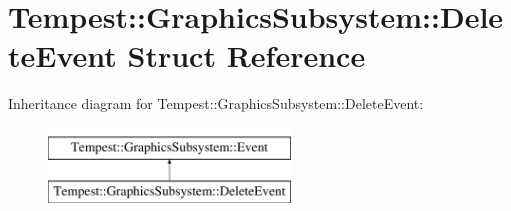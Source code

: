 \hypertarget{struct_tempest_1_1_graphics_subsystem_1_1_delete_event}{\section{Tempest\+:\+:Graphics\+Subsystem\+:\+:Delete\+Event Struct Reference}
\label{struct_tempest_1_1_graphics_subsystem_1_1_delete_event}
}
Inheritance diagram for Tempest\+:\+:Graphics\+Subsystem\+:\+:Delete\+Event\+:\begin{figure}[H]
\begin{center}
\leavevmode
\includegraphics[height=2.000000cm]{struct_tempest_1_1_graphics_subsystem_1_1_delete_event}
\end{center}
\end{figure}
